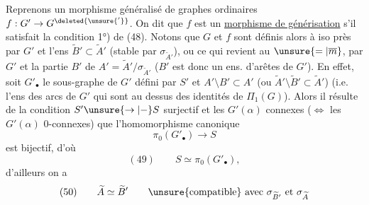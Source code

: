 Reprenons un morphisme généralisé de graphes ordinaires $f:G'\to G^{\deleted{\unsure{'}}}$. On dit que $f$ est un \uline{morphisme de générisation} s'il satisfait la condition 1°) de (48). Notons que $G$ et $f$ sont définis alors à iso près par $G'$ et l'ens $\widetilde B'\subset\widetilde A'$ (stable par $\sigma_{\widetilde A'}$), ou ce qui revient au $\unsure{=|\overline m}$, par $G'$ et la  partie $B'$ de $A'=\widetilde A'/\sigma_{\widetilde A'}$ ($B'$ est donc un ens. d'arêtes de $G'$). En effet, soit $G'_\bullet$ le sous-graphe de $G'$ défini par $S'$ et $A'\setminus B'\subset A'$ (ou $\widetilde A'\setminus\widetilde B'\subset\widetilde A'$) (i.e.  l'ens des  arcs de $G'$ qui sont au dessus des identités de $\Pi_1(G)$). Alors il résulte de la condition $S'\unsure{\to|{-}}S$ surjectif et les $G'(\alpha)$ connexes ($\Longleftrightarrow$ les $G'(\alpha)$ 0-connexes) que  l'homomorphisme canonique
\[
\pi_0(G'_\bullet)\longrightarrow S
\]
est bijectif, d'où
\[
(49)\qquad S\simeq\pi_0(G'_\bullet),
\]
d'ailleurs on a
\[
(50)\qquad\widetilde A\simeq\widetilde B'\qquad\unsure{\text{compatible}}\text{ avec }\sigma_{\widetilde B'}\text{ et }\sigma_{\widetilde A}
\]

